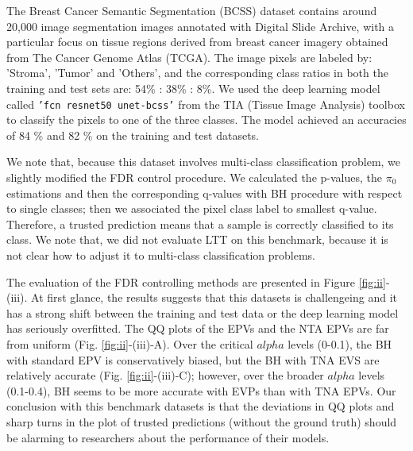 \documentclass{article}
\begin{document}
The Breast Cancer Semantic Segmentation (BCSS) dataset \cite{Amgad2019StructuredCE} contains around 20,000 image segmentation images annotated with Digital Slide Archive, with a particular focus on tissue regions derived from breast cancer imagery obtained from The Cancer Genome Atlas (TCGA). The image pixels are labeled by: 'Stroma', 'Tumor' and 'Others', and the corresponding class ratios in both the training and test sets are: 54\% : 38\% : 8\%. We used the deep learning model called \texttt{'fcn resnet50 unet-bcss'} from the TIA (Tissue Image Analysis) toolbox \cite{Pocock2022} to classify the pixels to one of the three classes. The model achieved an accuracies of 84 \% and 82 \% on the training and test datasets. 

We note that, because this dataset involves multi-class classification problem, we slightly modified the FDR control procedure. We calculated the p-values, the $\pi_0$ estimations and then the corresponding q-values with BH procedure with respect to single classes; then we associated the pixel class label to smallest q-value. Therefore, a trusted prediction means that a sample is correctly classified to its class. We note that, we did not evaluate LTT on this benchmark, because it is not clear how to adjust it to multi-class classification problems.

The evaluation of the FDR controlling methods are presented in Figure \ref{fig:ii}-(iii). At first glance, the results suggests that this datasets is challengeing and it  has a strong shift between the training and test data or the deep learning model has seriously overfitted. The QQ plots of the EPVs and the NTA EPVs are far from uniform (Fig. \ref{fig:ii}-(iii)-A). Over the critical $alpha$ levels (0-0.1), the BH with standard EPV is conservatively biased, but the BH with TNA EVS are relatively accurate (Fig. \ref{fig:ii}-(iii)-C); however, over the broader $alpha$ levels (0.1-0.4), BH seems to be more accurate with EVPs than with TNA EPVs. Our conclusion with this benchmark datasets is that the deviations in QQ plots and sharp turns in the plot of trusted predictions (without the ground truth) should be alarming to researchers about the performance of their models. 
\end{document}

